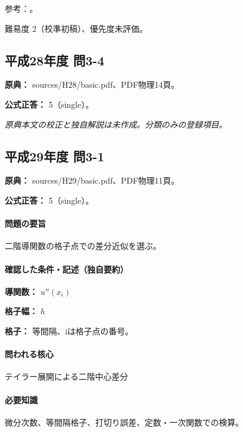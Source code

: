 \par 参考：\cite{mit_jacobian2007}。

\par 難易度 2（校準初稿）、優先度未評価。

\subsection{平成28年度 問3-4}
\label{q:h28-reg-basic-3-4}

\noindent\textbf{原典：} sources/H28/basic.pdf、PDF物理14頁。

\textbf{公式正答：} 5（single）。

\par\textit{原典本文の校正と独自解説は未作成。分類のみの登録項目。}

\subsection{平成29年度 問3-1}
\label{q:h29-reg-basic-3-1}

\noindent\textbf{原典：} sources/H29/basic.pdf、PDF物理11頁。

\textbf{公式正答：} 5（single）。

\paragraph{問題の要旨} 二階導関数の格子点での差分近似を選ぶ。

\paragraph{確認した条件・記述（独自要約）}\mbox{}\par

\noindent\textbf{導関数：} \(u''(x_i)\)\par

\noindent\textbf{格子幅：} \(h\)\par

\noindent\textbf{格子：} 等間隔、iは格子点の番号。\par

\paragraph{問われる核心} テイラー展開による二階中心差分

\paragraph{必要知識} 微分次数、等間隔格子、打切り誤差、定数・一次関数での検算。

